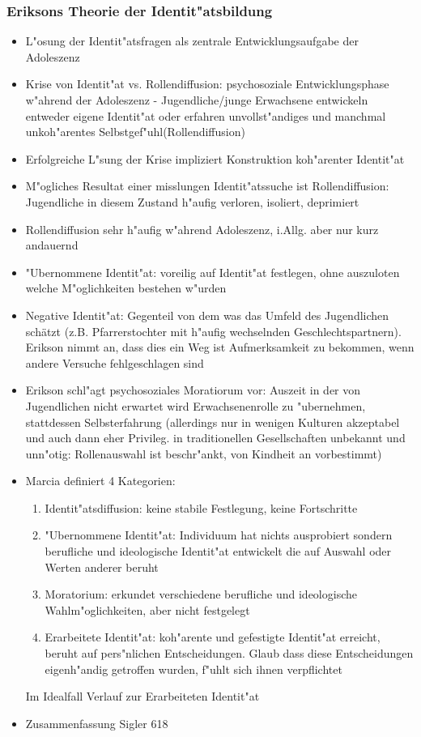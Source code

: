 \subsubsection{Eriksons Theorie der Identit"atsbildung}
\begin{itemize}
	\item
		L"osung der Identit"atsfragen als zentrale Entwicklungsaufgabe der Adoleszenz
	\item
		Krise von Identit"at vs. Rollendiffusion: psychosoziale Entwicklungsphase w"ahrend der Adoleszenz - Jugendliche/junge Erwachsene entwickeln entweder eigene Identit"at oder erfahren unvollst"andiges und manchmal unkoh"arentes Selbstgef"uhl(Rollendiffusion)
	\item
		Erfolgreiche L"sung der Krise impliziert Konstruktion koh"arenter Identit"at
	\item
		M"ogliches Resultat einer misslungen Identit"atssuche ist Rollendiffusion: Jugendliche in diesem Zustand h"aufig verloren, isoliert, deprimiert 
	\item
		Rollendiffusion sehr h"aufig w"ahrend Adoleszenz, i.Allg. aber nur kurz andauernd
	\item
		"Ubernommene Identit"at: voreilig auf Identit"at festlegen, ohne auszuloten welche M"oglichkeiten bestehen w"urden
	\item
		Negative Identit"at: Gegenteil von dem was das Umfeld des Jugendlichen schätzt (z.B. Pfarrerstochter mit h"aufig wechselnden Geschlechtspartnern). Erikson nimmt an, dass dies ein Weg ist Aufmerksamkeit zu bekommen, wenn andere Versuche fehlgeschlagen sind
	\item
		Erikson schl"agt psychosoziales Moratiorum vor: Auszeit in der von Jugendlichen nicht erwartet wird Erwachsenenrolle zu "ubernehmen, stattdessen Selbsterfahrung (allerdings nur in wenigen Kulturen akzeptabel und auch dann eher Privileg. in traditionellen Gesellschaften unbekannt und unn"otig: Rollenauswahl ist beschr"ankt, von Kindheit an vorbestimmt)
	\item
		Marcia definiert 4 Kategorien:
		\begin{enumerate}
			\item
				Identit"atsdiffusion: keine stabile Festlegung, keine Fortschritte
			\item
				"Ubernommene Identit"at: Individuum hat nichts ausprobiert sondern berufliche und ideologische Identit"at entwickelt die auf Auswahl oder Werten anderer beruht
			\item
				Moratorium: erkundet verschiedene berufliche und ideologische Wahlm"oglichkeiten, aber nicht festgelegt
			\item
				Erarbeitete Identit"at: koh"arente und gefestigte Identit"at erreicht, beruht auf pers"nlichen Entscheidungen. Glaub dass diese Entscheidungen eigenh"andig getroffen wurden, f"uhlt sich ihnen verpflichtet
		\end{enumerate}
		Im Idealfall Verlauf zur Erarbeiteten Identit"at
	\item
		Zusammenfassung Sigler 618
\end{itemize}
